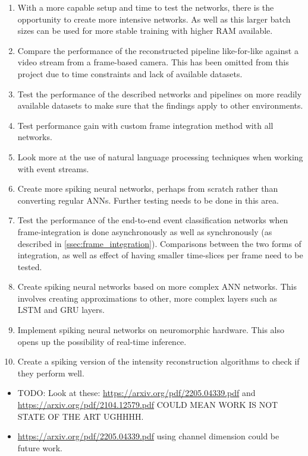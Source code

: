 \begin{enumerate}
    \item With a more capable setup and time to test the networks, there is the opportunity to create more intensive networks. As well as this larger batch sizes can be used for more stable training with higher RAM available.
    \item Compare the performance of the reconstructed pipeline like-for-like against a video stream from a frame-based camera. This has been omitted from this project due to time constraints and lack of available datasets.
    \item Test the performance of the described networks and pipelines on more readily available datasets to make sure that the findings apply to other environments.
    \item Test performance gain with custom frame integration method with all networks.
    \item Look more at the use of natural language processing techniques when working with event streams.
    \item Create more spiking neural networks, perhaps from scratch rather than converting regular ANNs. Further testing needs to be done in this area.
    \item Test the performance of the end-to-end event classification networks when frame-integration is done asynchronously as well as synchronously (as described in \cref{ssec:frame_integration}). Comparisons between the two forms of integration, as well as effect of having smaller time-slices per frame need to be tested.
    \item Create spiking neural networks based on more complex ANN networks. This involves creating approximations to other, more complex layers such as LSTM and GRU layers.
    \item Implement spiking neural networks on neuromorphic hardware. This also opens up the possibility of real-time inference.
    \item Create a spiking version of the intensity reconstruction algorithms to check if they perform well.
\end{enumerate}

\color{red}
\begin{itemize}
    \item TODO: Look at these: \url{https://arxiv.org/pdf/2205.04339.pdf} and \url{https://arxiv.org/pdf/2104.12579.pdf} COULD MEAN WORK IS NOT STATE OF THE ART UGHHHH. 
    \item \url{https://arxiv.org/pdf/2205.04339.pdf} using channel dimension could be future work.
\end{itemize}
\color{black}
